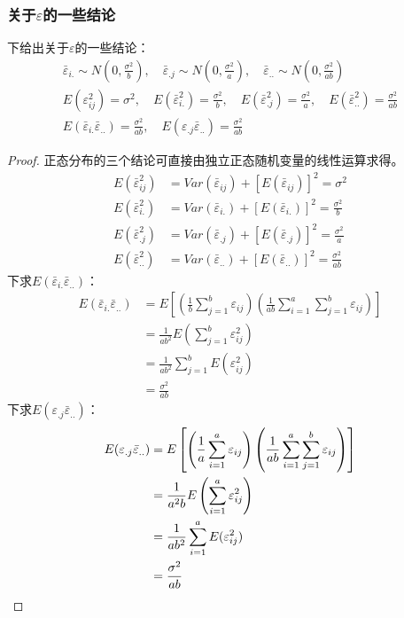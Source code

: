 \subsubsection{关于$\varepsilon$的一些结论}
下给出关于$\varepsilon$的一些结论：
\begin{gather*}
	\bar{\varepsilon}_{i.}\sim N(0,\frac{\sigma^2}{b}),\quad\bar{\varepsilon}_{.j}\sim
	N(0,\frac{\sigma^2}{a}),\quad\bar{\varepsilon}_{..}\sim N(0,\frac{\sigma^2}{ab}) \\
	E(\varepsilon_{ij}^2)=\sigma^2,\quad
	E(\bar{\varepsilon}_{i.}^2)=\frac{\sigma^2}{b},\quad
	E(\bar{\varepsilon}_{.j}^2)=\frac{\sigma^2}{a},\quad
	E(\bar{\varepsilon}_{..}^2)=\frac{\sigma^2}{ab} \\
	E(\bar{\varepsilon}_{i.}\bar{\varepsilon}_{..})=\frac{\sigma^2}{ab},\quad
	E(\varepsilon_{.j}\bar{\varepsilon}_{..})=\frac{\sigma^2}{ab}
\end{gather*}
\begin{proof}
	正态分布的三个结论可直接由独立正态随机变量的线性运算求得。
	\begin{align*}
		E(\bar{\varepsilon}_{ij}^2)&=Var(\bar{\varepsilon}_{ij})+[E(\bar{\varepsilon}_{ij})]^2=\sigma^2 \\
		E(\bar{\varepsilon}_{i.}^2)&=Var(\bar{\varepsilon}_{i.})+[E(\bar{\varepsilon}_{i.})]^2=\frac{\sigma^2}{b} \\
		E(\bar{\varepsilon}_{.j}^2)&=Var(\bar{\varepsilon}_{.j})+[E(\bar{\varepsilon}_{.j})]^2=\frac{\sigma^2}{a} \\
		E(\bar{\varepsilon}_{..}^2)&=Var(\bar{\varepsilon}_{..})+[E(\bar{\varepsilon}_{..})]^2=\frac{\sigma^2}{ab}
	\end{align*}
	下求$E(\bar{\varepsilon}_{i.}\bar{\varepsilon}_{..})$：
	\begin{align*}
		E(\bar{\varepsilon}_{i.}\bar{\varepsilon}_{..})
		&=E\left[\left(\frac{1}{b}\sum_{j=1}^b\varepsilon_{ij}\right)\left(\frac{1}{ab}\sum_{i=1}^a\sum_{j=1}^b\varepsilon_{ij}\right)\right] \\
		&=\frac{1}{ab^2}E\left(\sum_{j=1}^b\varepsilon_{ij}^2\right) \\
		&=\frac{1}{ab^2}\sum_{j=1}^bE(\varepsilon_{ij}^2) \\
		&=\frac{\sigma^2}{ab}
	\end{align*}
	下求$E(\varepsilon_{.j}\bar{\varepsilon}_{..})$：
	\begin{align*}
		E(\varepsilon_{.j}\bar{\varepsilon}_{..})
		&=E\left[\left(\frac{1}{a}\sum_{i=1}^a\varepsilon_{ij}\right)\left(\frac{1}{ab}\sum_{i=1}^a\sum_{j=1}^b\varepsilon_{ij}\right)\right] \\
		&=\frac{1}{a^2b}E\left(\sum_{i=1}^a\varepsilon_{ij}^2\right) \\
		&=\frac{1}{ab^2}\sum_{i=1}^aE(\varepsilon_{ij}^2) \\
		&=\frac{\sigma^2}{ab}\qedhere
	\end{align*}
\end{proof}
